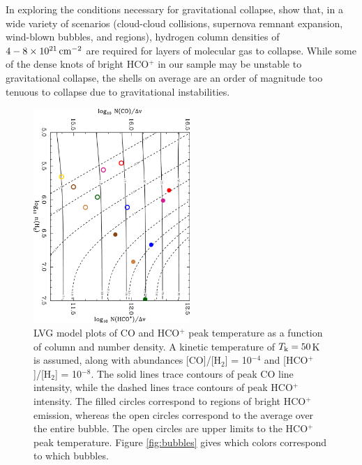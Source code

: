 In exploring the conditions necessary for gravitational collapse,
 show that, in a wide variety of scenarios
(cloud-cloud collisions, supernova remnant expansion,
wind-blown bubbles, and \hii regions),
hydrogen column densities of $4-8 \times 10^{21}\, {\rm cm}^{-2}$
are required for layers of molecular gas to collapse. While some of the
dense knots of bright HCO$^+$ in our sample may be unstable to
gravitational collapse,
the shells on average are an order of magnitude too tenuous to
collapse due to gravitational instabilities.


\begin{figure}
\includegraphics[height=3.2in, angle=90]{lvg}
\caption{LVG model plots of CO and HCO$^+$ peak temperature as a function of column and number density. A kinetic temperature of $T_{\rm k} = 50$K is assumed,
along with abundances [CO]/[H$_2$] = 10$^{-4}$ and [HCO$^+$]/[H$_2$] = 10$^{-8}$.
 The solid lines trace contours of peak CO line intensity, while the dashed lines trace contours of peak HCO$^+$ intensity.
The filled circles correspond to regions of bright HCO$^+$ emission, whereas the open circles correspond to the average over the entire bubble.
The open circles are upper limits to the HCO$^+$ peak temperature.
Figure \ref{fig:bubbles}
gives which colors correspond to which bubbles.}
\label{fig:lvg}
\end{figure}

